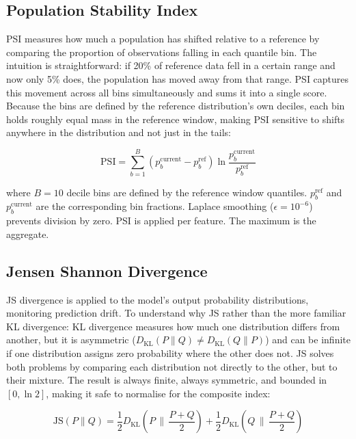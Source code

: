 \subsection{Population Stability Index}
\label{subsec:psi}

PSI measures how much a population has shifted relative to a reference by comparing the proportion of observations falling in each quantile bin. The intuition is straightforward: if 20\% of reference data fell in a certain range and now only 5\% does, the population has moved away from that range. PSI captures this movement across all bins simultaneously and sums it into a single score. Because the bins are defined by the reference distribution's own deciles, each bin holds roughly equal mass in the reference window, making PSI sensitive to shifts anywhere in the distribution and not just in the tails:

\begin{equation}
  \text{PSI} = \sum_{b=1}^{B} \left( p_b^{\text{current}} - p_b^{\text{ref}} \right)
    \ln \frac{p_b^{\text{current}}}{p_b^{\text{ref}}}
  \label{eq:psi}
\end{equation}

where $B = 10$ decile bins are defined by the reference window quantiles. $p_b^{\text{ref}}$ and $p_b^{\text{current}}$ are the corresponding bin fractions. Laplace smoothing ($\epsilon = 10^{-6}$) prevents division by zero. PSI is applied per feature. The maximum is the aggregate.

\subsection{Jensen Shannon Divergence}
\label{subsec:js}

JS divergence is applied to the model's output probability distributions, monitoring prediction drift. To understand why JS rather than the more familiar KL divergence: KL divergence measures how much one distribution differs from another, but it is asymmetric ($D_{\text{KL}}(P \| Q) \neq D_{\text{KL}}(Q \| P)$) and can be infinite if one distribution assigns zero probability where the other does not. JS solves both problems by comparing each distribution not directly to the other, but to their mixture. The result is always finite, always symmetric, and bounded in $[0, \ln 2]$, making it safe to normalise for the composite index:

\begin{equation}
  \text{JS}(P \| Q) = \frac{1}{2} D_{\text{KL}}\!\left(P \,\Big\|\, \frac{P+Q}{2}\right)
                    + \frac{1}{2} D_{\text{KL}}\!\left(Q \,\Big\|\, \frac{P+Q}{2}\right)
  \label{eq:js}
\end{equation}


